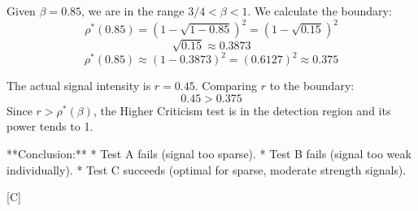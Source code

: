 Given $\beta = 0.85$, we are in the range $3/4 < \beta < 1$. We calculate the boundary:
$$ \rho^*(0.85) = (1 - \sqrt{1 - 0.85})^2 = (1 - \sqrt{0.15})^2 $$
$$ \sqrt{0.15} \approx 0.3873 $$
$$ \rho^*(0.85) \approx (1 - 0.3873)^2 = (0.6127)^2 \approx 0.375 $$

The actual signal intensity is $r = 0.45$.
Comparing $r$ to the boundary:
$$ 0.45 > 0.375 $$
Since $r > \rho^*(\beta)$, the Higher Criticism test is in the detection region and its power tends to 1.

**Conclusion:**
*   Test A fails (signal too sparse).
*   Test B fails (signal too weak individually).
*   Test C succeeds (optimal for sparse, moderate strength signals).

[C]
